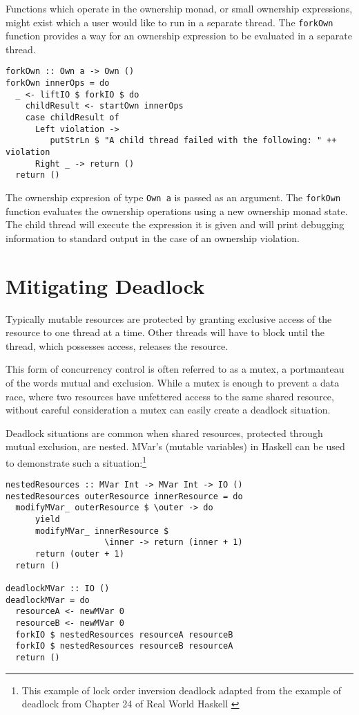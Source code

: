 \documentclass[onehalf,11pt]{beavtex}
\begin{document}
Functions which operate in the ownership monad, or small ownership expressions,
might exist which a user would like to run in a separate thread.
The \texttt{forkOwn} function provides a way for an ownership expression to be
evaluated in a separate thread.

\begin{verbatim}
forkOwn :: Own a -> Own ()
forkOwn innerOps = do
  _ <- liftIO $ forkIO $ do
    childResult <- startOwn innerOps
    case childResult of
      Left violation -> 
         putStrLn $ "A child thread failed with the following: " ++ violation
      Right _ -> return ()
  return ()
\end{verbatim}

The ownership expresion of type \texttt{Own a} is passed as
an argument. The \texttt{forkOwn} function evaluates the ownership operations
using a new ownership monad state. The child thread will execute the
expression it is given and will print debugging information to standard output
in the case of an ownership violation.



\section{Mitigating Deadlock}

Typically mutable resources are protected by granting exclusive access
of the resource to one thread at a time.
Other threads will have to block until the thread, which possesses access,
releases the resource.

This form of concurrency control is often referred to as a mutex, a
portmanteau of the words mutual and exclusion.
While a mutex is enough to prevent a data race, where two resources have
unfettered access to the same shared resource, without careful consideration
a mutex can easily create a deadlock situation.

Deadlock situations are common when shared resources, protected through
mutual exclusion, are nested.  MVar's (mutable variables) in Haskell can be
used to demonstrate such a situation:\footnote{ This example of lock order
  inversion deadlock adapted from the example of deadlock from Chapter 24 of
  Real World Haskell \cite{O'Sullivan:2008:RWH:1523280} }

\begin{lstlisting}
nestedResources :: MVar Int -> MVar Int -> IO ()
nestedResources outerResource innerResource = do
  modifyMVar_ outerResource $ \outer -> do
      yield
      modifyMVar_ innerResource $
                    \inner -> return (inner + 1)
      return (outer + 1)
  return ()

deadlockMVar :: IO ()
deadlockMVar = do
  resourceA <- newMVar 0
  resourceB <- newMVar 0
  forkIO $ nestedResources resourceA resourceB
  forkIO $ nestedResources resourceB resourceA
  return ()
\end{lstlisting}
\end{document}
